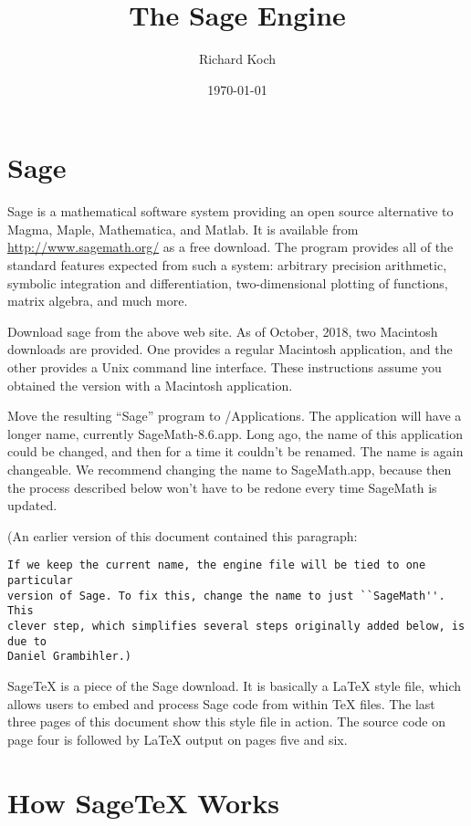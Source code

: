 \documentclass[11pt, oneside]{amsart}
\title{The Sage Engine}
\author{Richard Koch}
\date{\today}
\begin{document}
\maketitle
\vspace{-.3in}
\section{Sage}
Sage is a mathematical software system providing an open source alternative to Magma, Maple, Mathematica, and Matlab. It is available from 
\url{http://www.sagemath.org/} as a free download. The program provides all of the standard features expected from such a system: arbitrary precision arithmetic, symbolic integration and differentiation, two-dimensional plotting of functions, matrix algebra, and much more.

Download sage from the above web site. As of October, 2018, two Macintosh downloads are provided. One provides a regular Macintosh application, and the other provides a Unix command line interface. These instructions assume you obtained the version with a Macintosh application.

Move the resulting ``Sage'' program to /Applications. The
application will have a longer name, currently SageMath-8.6.app.  Long ago, the name of this application could be changed, and then for a time it couldn't be renamed. The name is again changeable.  We recommend changing the name to SageMath.app, because then the process described below won't have to be redone every time SageMath is updated.

(An earlier version of this document contained this paragraph: 
\begin{verbatim}
If we keep the current name, the engine file will be tied to one particular
version of Sage. To fix this, change the name to just ``SageMath''. This 
clever step, which simplifies several steps originally added below, is due to 
Daniel Grambihler.)
\end{verbatim}


SageTeX is a piece of the Sage download. It is basically a LaTeX style file, which  allows users to embed and process Sage code from within TeX files. The last three pages of this document show this style file in action. The source code on page four is followed by LaTeX output on pages five and six.

\section{How SageTeX Works}
\end{document}
